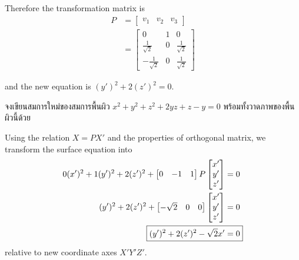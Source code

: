 \documentclass[12pt,final]{novelette} %
\begin{document}
\begin{question}
\begin{question}
        Therefore the transformation matrix is
        \begin{align*}
            P & = \begin{bmatrix}
                      v_1 & v_2 & v_3
                  \end{bmatrix}                             \\
              & = \boxed{\begin{bmatrix}
                                 0               & 1 & 0              \\
                                 \frac1{\sqrt2}  & 0 & \frac1{\sqrt2} \\
                                 -\frac1{\sqrt2} & 0 & \frac1{\sqrt2}
                             \end{bmatrix}}
        \end{align*}

        and the new equation is $(y')^2 + 2(z')^2 = 0$.


        \item
        จงเขียนสมการใหม่ของสมการพื้นผิว $x^2 + y^2 + z^2 + 2yz + z - y = 0$
        พร้อมทั้งวาดภาพของพื้นผิวนี้ด้วย 

        \bigskip
        Using the relation $X = PX'$ and the properties of orthogonal matrix, we transform the surface equation into
        \begin{align*}
            0(x')^2 + 1(y')^2 + 2(z')^2 +
            \begin{bmatrix}
                0 & -1 & 1
            \end{bmatrix}
            P
            \begin{bmatrix}
                x' \\ y' \\ z'
            \end{bmatrix}
                                                 & = 0  \\
            (y')^2 + 2(z')^2 +
            \begin{bmatrix}
                -\sqrt2 & 0 & 0
            \end{bmatrix}
            \begin{bmatrix}
                x' \\ y' \\ z'
            \end{bmatrix}
                                                 & = 0  \\
            \Aboxed{(y')^2 + 2(z')^2 - \sqrt2 x' & = 0}
        \end{align*}
        relative to new coordinate axes $X'Y'Z'$.


\end{question}
\end{question}
\end{document}

